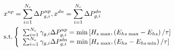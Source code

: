 \begin{align} &{x^{up}} = \sum\limits_{i = 1}^{{N_c}} {\Delta P_{g,i}^{up}},{x^{dn}} = \sum\limits_{i = 1}^{{N_c}} {\Delta P_{g,i}^{dn}} \nonumber\\ & {\text{s.t.}}\left\{ \begin{array}{l} \sum\nolimits_{i = 1}^{{N_c}} {{\gamma _{g,i}}\Delta P_{g,i}^{up}} = {{\min}}\left[ {{H_{s\;{\rm{max}}}},\left({{E_{hs\;{\rm{max}}}} - {E_{hs}}} \right)/\tau } \right]\\ \sum\nolimits_{i = 1}^{{N_c}} {{\gamma _{g,i}}\Delta P_{g,i}^{dn}} = {{\min}}\left[ {{H_{s\;{\rm{max}}}},\left({{E_{hs}} - {E_{hs\min}}} \right)/\tau } \right] \end{array} \right. \end{align}
